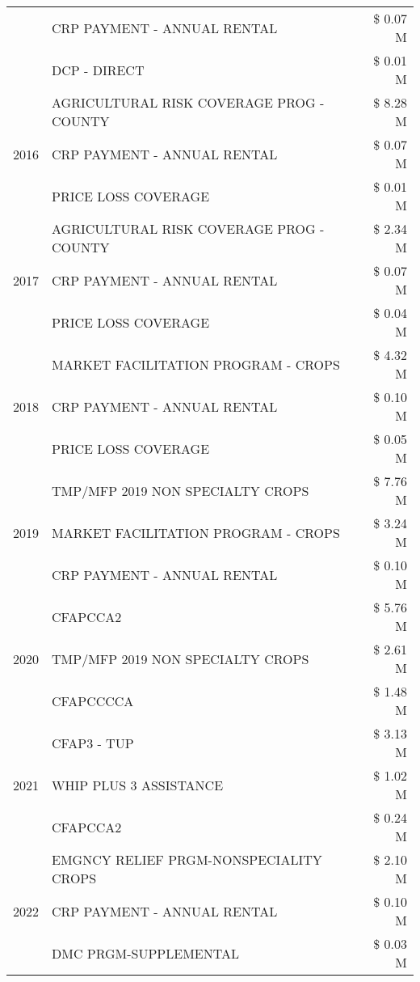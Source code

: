 \begin{tabular}{llr}
 & CRP PAYMENT - ANNUAL RENTAL & \$ 0.07 M \\
 & DCP - DIRECT & \$ 0.01 M \\
\cline{1-3}
\multirow[t]{3}{*}{2016} & AGRICULTURAL RISK COVERAGE PROG - COUNTY & \$ 8.28 M \\
 & CRP PAYMENT - ANNUAL RENTAL & \$ 0.07 M \\
 & PRICE LOSS COVERAGE & \$ 0.01 M \\
\cline{1-3}
\multirow[t]{3}{*}{2017} & AGRICULTURAL RISK COVERAGE PROG - COUNTY & \$ 2.34 M \\
 & CRP PAYMENT - ANNUAL RENTAL & \$ 0.07 M \\
 & PRICE LOSS COVERAGE & \$ 0.04 M \\
\cline{1-3}
\multirow[t]{3}{*}{2018} & MARKET FACILITATION PROGRAM - CROPS & \$ 4.32 M \\
 & CRP PAYMENT - ANNUAL RENTAL & \$ 0.10 M \\
 & PRICE LOSS COVERAGE & \$ 0.05 M \\
\cline{1-3}
\multirow[t]{3}{*}{2019} & TMP/MFP 2019 NON SPECIALTY CROPS & \$ 7.76 M \\
 & MARKET FACILITATION PROGRAM - CROPS & \$ 3.24 M \\
 & CRP PAYMENT - ANNUAL RENTAL & \$ 0.10 M \\
\cline{1-3}
\multirow[t]{3}{*}{2020} & CFAPCCA2 & \$ 5.76 M \\
 & TMP/MFP 2019 NON SPECIALTY CROPS & \$ 2.61 M \\
 & CFAPCCCCA & \$ 1.48 M \\
\cline{1-3}
\multirow[t]{3}{*}{2021} & CFAP3 - TUP & \$ 3.13 M \\
 & WHIP PLUS 3 ASSISTANCE & \$ 1.02 M \\
 & CFAPCCA2 & \$ 0.24 M \\
\cline{1-3}
\multirow[t]{3}{*}{2022} & EMGNCY RELIEF PRGM-NONSPECIALITY CROPS & \$ 2.10 M \\
 & CRP PAYMENT - ANNUAL RENTAL & \$ 0.10 M \\
 & DMC PRGM-SUPPLEMENTAL & \$ 0.03 M \\
\cline{1-3}
\bottomrule
\end{tabular}
